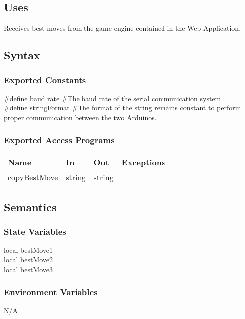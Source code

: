 \documentclass[12pt, titlepage]{article}
\begin{document}
        \subsection{Uses}
        Receives best moves from the game engine contained in the Web Application.
    
        \subsection{Syntax}
        \subsubsection{Exported Constants}
        \#define baud rate \#The baud rate of the serial communication system\\
        \#define stringFormat \#The format of the string remains constant to perform proper 
        communication between the two Arduinos.
        
        \subsubsection{Exported Access Programs}
            \begin{center}
            \begin{tabular}{p{4cm} p{3cm} p{3cm} p{2.5cm}}
            \hline
            \textbf{Name} & \textbf{In} & \textbf{Out} & \textbf{Exceptions} \\
            \hline
            copyBestMove & string & string & \\
            \hline
            \end{tabular}
            \end{center}
    
        \subsection{Semantics}
        \subsubsection{State Variables}
        local bestMove1 \\
        local bestMove2 \\
        local bestMove3 
    
        \subsubsection{Environment Variables}
        N/A
    
\end{document}
